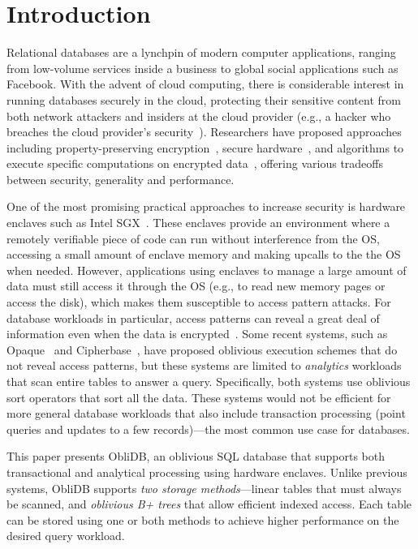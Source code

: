 \documentclass[letterpaper,twocolumn,10pt]{article}
\def\name/{ObliDB}
\begin{document}
\section{Introduction}

Relational databases are a lynchpin of modern computer applications, ranging from low-volume services inside a business to global social applications such as Facebook.
With the advent of cloud computing, there is considerable interest in running databases securely in the cloud, protecting their sensitive content from both network attackers and insiders at the cloud provider (e.g., a hacker who breaches the cloud provider's security~\cite{yahoo-hack}).
Researchers have proposed approaches including property-preserving encryption~\cite{PRZB12,mylar,FVY+17}, secure hardware~\cite{cipherbase,ZDB+17}, and algorithms to execute specific computations on encrypted data~\cite{WZPM16,NWI+13}, offering various tradeoffs between security, generality and performance.

One of the most promising practical approaches to increase security is hardware enclaves such as Intel SGX~\cite{CD16}.
These enclaves provide an environment where a remotely verifiable piece of code can run without interference from the OS, accessing a small amount of enclave memory and making upcalls to the the OS when needed.
However, applications using enclaves to manage a large amount of data must still access it through the OS (e.g., to read new memory pages or access the disk), which makes them susceptible to access pattern attacks.
For database workloads in particular, access patterns can reveal a great deal of information even when the data is encrypted~\cite{IKK12,XCP15}. %
Some recent systems, such as Opaque~\cite{ZDB+17} and Cipherbase~\cite{cipherbase}, have proposed oblivious execution schemes that do not reveal access patterns, but these systems are limited to \emph{analytics} workloads that scan entire tables to answer a query.
Specifically, both systems use oblivious sort operators that sort all the data.
These systems would not be efficient for more general database workloads that also include transaction processing (point queries and updates to a few records)---the most common use case for databases.

This paper presents \name/, an oblivious SQL database that supports both transactional and analytical processing using hardware enclaves. Unlike previous systems, \name/ supports \emph{two storage methods}---linear tables that must always be scanned, and \emph{oblivious B+ trees} that allow efficient indexed access. Each table can be stored using one or both methods to achieve higher performance on the desired query workload.
\end{document}
